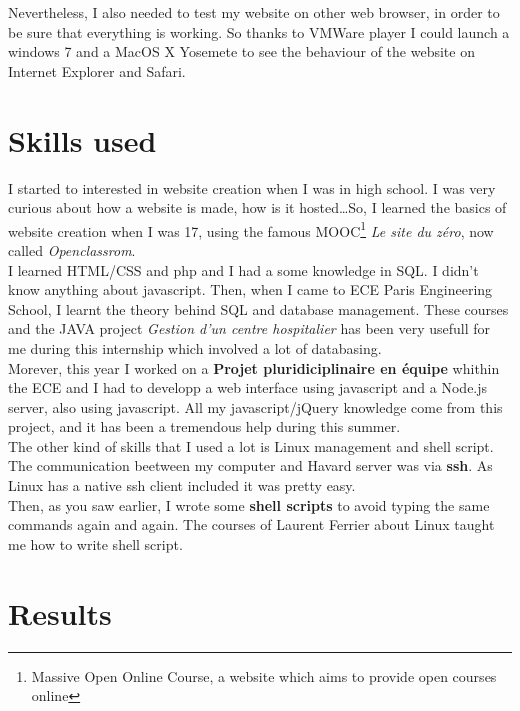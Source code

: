 \documentclass[10pt,a4paper]{article}
\begin{document}
Nevertheless, I also needed to test my website on other web browser, in order to be sure that everything is working. So thanks to VMWare player I could launch a windows 7 and a MacOS X Yosemete to see the behaviour of the website on Internet Explorer and Safari.

\section{Skills used}

I started to interested in website creation when I was in high school. I was very curious about how a website is made, how is it hosted\ldots So, I learned the basics of website creation when I was 17, using the famous MOOC\footnote{Massive Open Online Course, a website which aims to provide open courses online} \textit{Le site du zéro}, now called \textit{Openclassrom}.\\
I learned HTML/CSS and php and I had a some knowledge in SQL. I didn't know anything about javascript.
Then, when I came to ECE Paris Engineering School, I learnt the theory behind SQL and database management. These courses and the JAVA project \textit{Gestion d'un centre hospitalier} has been very usefull for me during this internship which involved a lot of databasing.\\
Morever, this year I worked on a \textbf{Projet pluridiciplinaire en équipe} whithin the ECE and I had to developp a web interface using javascript and a Node.js server, also using javascript. All my javascript/jQuery knowledge come from this project, and it has been a tremendous help during this summer.\\

The other kind of skills that I used a lot is Linux management and shell script.\\
The communication beetween my computer and Havard server was via \textbf{ssh}. As Linux has a native ssh client included it was pretty easy.\\
Then, as you saw earlier, I wrote some \textbf{shell scripts} to avoid typing the same commands again and again. The courses of Laurent Ferrier about Linux taught me how to write shell script.\\

\section{Results}
\end{document}
